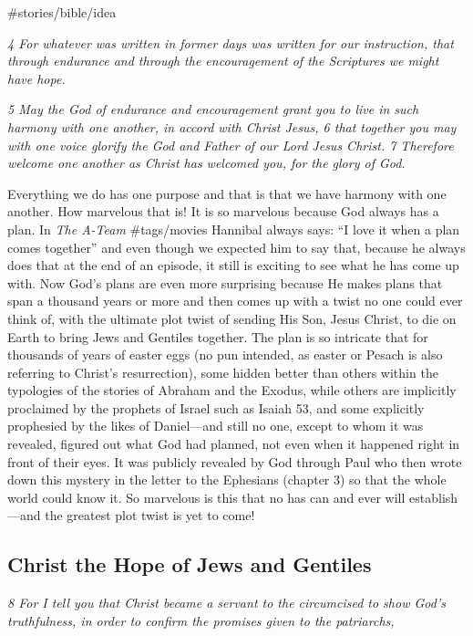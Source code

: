 \#stories/bible/idea

\emph{4 For whatever was written in former days was written for our
instruction, that through endurance and through the encouragement of the
Scriptures we might have hope.}

\emph{5 May the God of endurance and encouragement grant you to live in
such harmony with one another, in accord with Christ Jesus, 6 that
together you may with one voice glorify the God and Father of our Lord
Jesus Christ. 7 Therefore welcome one another as Christ has welcomed
you, for the glory of God.}

Everything we do has one purpose and that is that we have harmony with
one another. How marvelous that is! It is so marvelous because God
always has a plan. In \emph{The A-Team} \#tags/movies Hannibal always
says: ``I love it when a plan comes together'' and even though we
expected him to say that, because he always does that at the end of an
episode, it still is exciting to see what he has come up with. Now God's
plans are even more surprising because He makes plans that span a
thousand years or more and then comes up with a twist no one could ever
think of, with the ultimate plot twist of sending His Son, Jesus Christ,
to die on Earth to bring Jews and Gentiles together. The plan is so
intricate that for thousands of years of easter eggs (no pun intended,
as easter or Pesach is also referring to Christ's resurrection), some
hidden better than others within the typologies of the stories of
Abraham and the Exodus, while others are implicitly proclaimed by the
prophets of Israel such as Isaiah 53, and some explicitly prophesied by
the likes of Daniel---and still no one, except to whom it was revealed,
figured out what God had planned, not even when it happened right in
front of their eyes. It was publicly revealed by God through Paul who
then wrote down this mystery in the letter to the Ephesians (chapter 3)
so that the whole world could know it. So marvelous is this that no has
can and ever will establish---and the greatest plot twist is yet to
come!

\subsection{Christ the Hope of Jews and Gentiles} \emph{8 For I tell you
that Christ became a servant to the circumcised to show God's
truthfulness, in order to confirm the promises given to the patriarchs,}

